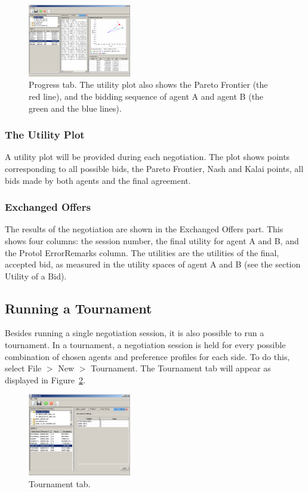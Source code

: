 \documentclass[]{article}
\begin{document}
{\begin{figure}[htb]
	\centering
	\includegraphics[width=0.4\textwidth]{media/image15.png}
\caption{Progress tab. The utility plot also shows the Pareto Frontier (the red line), and the bidding sequence of agent A and agent B (the green and the blue lines).}\label{Fig:progress}
\end{figure}

\subsubsection{The Utility Plot}

A utility plot will be provided during each negotiation. The plot shows points corresponding to all possible bids, the Pareto Frontier, Nash and Kalai points, all bids made by both agents and the final agreement.

\subsubsection{Exchanged Offers}

The results of the negotiation are shown in the Exchanged Offers part. This shows four columns: the session number, the final utility for agent A and B, and the Protol ErrorRemarks column. The utilities are the utilities of the final, accepted bid, as measured in the utility spaces of agent A and B (see the section Utility of a Bid).

\subsection{Running a Tournament}

Besides running a single negotiation session, it is also possible to run a tournament. In a tournament, a negotiation session is held for every possible combination of chosen agents and preference profiles for each side. To do this, select File $>$ New $>$ Tournament. The Tournament tab will appear as displayed in Figure~\ref{Fig:tournament}. 
 
\begin{figure}[htb]
	\centering
	\includegraphics[width=0.4\textwidth]{media/image16.png}
\caption{Tournament tab.}\label{Fig:tournament}
\end{figure}

}
\end{document}
